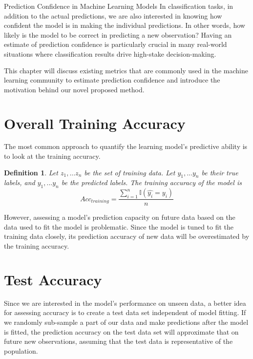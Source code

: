 \documentclass[12pt]{pom_thesis}
\newtheorem{definition}{Definition}[section]
\begin{document}
\begin{chapter}{Prediction Confidence in Machine Learning Models}
In  classification tasks, in addition to the actual predictions, we are also interested in knowing how confident the model is in making the individual predictions. In other words, how likely is the model to be correct in predicting a new observation? Having an estimate of prediction confidence is particularly crucial in many real-world situations where classification results drive high-stake decision-making. 

This chapter will discuss existing metrics that are commonly used in the machine learning community to estimate prediction confidence and introduce the motivation behind our novel proposed method.


\section{Overall Training Accuracy}
The most common approach to quantify the learning model's predictive ability is to look at the training accuracy.

\begin{definition}
Let $z_1,...z_n$ be the set of training data. Let $y_1,...y_n$ be their true labels, and $\hat{y_1},...\hat{y_n}$ be the predicted labels. The training accuracy of the model is
\begin{equation}
\label{acc_train}
    Acc_{training}=\frac{\sum_{i=1}^n \mathbb{I}(\hat{y_i}=y_i)}{n}
\end{equation}
\end{definition}

However, assessing a model's prediction capacity on future data based on the data used to fit the model is problematic. Since the model is tuned to fit the training data closely, its prediction accuracy of new data will be overestimated by the training accuracy. 


\section{Test Accuracy}
Since we are interested in the model's performance on unseen data, a better idea for assessing accuracy is to create a test data set independent of model fitting. If we randomly sub-sample a part of our data and make predictions after the model is fitted, the prediction accuracy on the test data set will approximate that on future new observations, assuming that the test data is representative of the population. 


\end{chapter}
\end{document}
